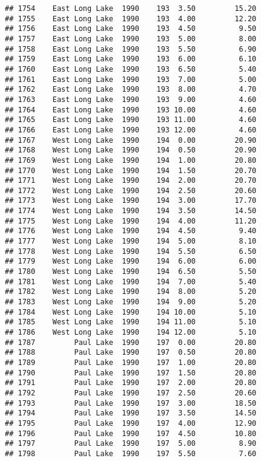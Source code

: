 \documentclass[
]{article}
\begin{document}
\begin{verbatim}
## 1754    East Long Lake  1990    193  3.50         15.20
## 1755    East Long Lake  1990    193  4.00         12.20
## 1756    East Long Lake  1990    193  4.50          9.50
## 1757    East Long Lake  1990    193  5.00          8.00
## 1758    East Long Lake  1990    193  5.50          6.90
## 1759    East Long Lake  1990    193  6.00          6.10
## 1760    East Long Lake  1990    193  6.50          5.40
## 1761    East Long Lake  1990    193  7.00          5.00
## 1762    East Long Lake  1990    193  8.00          4.70
## 1763    East Long Lake  1990    193  9.00          4.60
## 1764    East Long Lake  1990    193 10.00          4.60
## 1765    East Long Lake  1990    193 11.00          4.60
## 1766    East Long Lake  1990    193 12.00          4.60
## 1767    West Long Lake  1990    194  0.00         20.90
## 1768    West Long Lake  1990    194  0.50         20.90
## 1769    West Long Lake  1990    194  1.00         20.80
## 1770    West Long Lake  1990    194  1.50         20.70
## 1771    West Long Lake  1990    194  2.00         20.70
## 1772    West Long Lake  1990    194  2.50         20.60
## 1773    West Long Lake  1990    194  3.00         17.70
## 1774    West Long Lake  1990    194  3.50         14.50
## 1775    West Long Lake  1990    194  4.00         11.20
## 1776    West Long Lake  1990    194  4.50          9.40
## 1777    West Long Lake  1990    194  5.00          8.10
## 1778    West Long Lake  1990    194  5.50          6.50
## 1779    West Long Lake  1990    194  6.00          6.00
## 1780    West Long Lake  1990    194  6.50          5.50
## 1781    West Long Lake  1990    194  7.00          5.40
## 1782    West Long Lake  1990    194  8.00          5.20
## 1783    West Long Lake  1990    194  9.00          5.20
## 1784    West Long Lake  1990    194 10.00          5.10
## 1785    West Long Lake  1990    194 11.00          5.10
## 1786    West Long Lake  1990    194 12.00          5.10
## 1787         Paul Lake  1990    197  0.00         20.80
## 1788         Paul Lake  1990    197  0.50         20.80
## 1789         Paul Lake  1990    197  1.00         20.80
## 1790         Paul Lake  1990    197  1.50         20.80
## 1791         Paul Lake  1990    197  2.00         20.80
## 1792         Paul Lake  1990    197  2.50         20.60
## 1793         Paul Lake  1990    197  3.00         18.50
## 1794         Paul Lake  1990    197  3.50         14.50
## 1795         Paul Lake  1990    197  4.00         12.90
## 1796         Paul Lake  1990    197  4.50         10.80
## 1797         Paul Lake  1990    197  5.00          8.90
## 1798         Paul Lake  1990    197  5.50          7.60

\end{verbatim}
\end{document}
